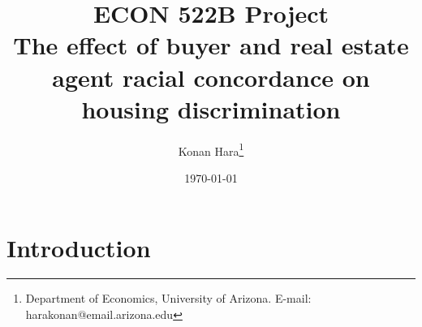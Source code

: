 \documentclass[12pt,a4paper]{article}
\begin{document}
\title{ECON 522B Project\\The effect of buyer and real estate agent racial concordance on housing discrimination}
\author{Konan Hara\footnote{Department of Economics, University of Arizona. E-mail: harakonan@email.arizona.edu}}
\date{\today}
\maketitle
\doublespacing


	
\clearpage

\section{Introduction}


\singlespacing
\clearpage



\clearpage









% 











  
 
\end{document}
